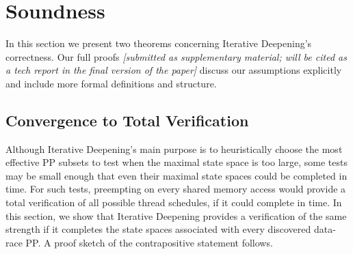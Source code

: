 \section{Soundness}
\label{sec:soundness}

In this section we present two theorems concerning Iterative Deepening's correctness.
Our full proofs
{\em [submitted as supplementary material; will be cited as a tech report in the final version of the paper]}
discuss our assumptions explicitly and include more formal definitions and structure.


\renewcommand\proofname{Proof Sketch}


\subsection{Convergence to Total Verification}
\label{sec:totalverif}

Although Iterative Deepening's main purpose is to heuristically choose the most effective PP subsets to test
when the maximal state space is too large,
some tests may be small enough that even their maximal state spaces could be completed in time.
For such tests, preempting on every shared memory access \cite{spin,inspect} would provide a total verification of all possible thread schedules, if it could complete in time.
In this section, we show that Iterative Deepening provides a verification of the same strength if it completes the state spaces associated with every discovered data-race PP.
A proof sketch of the contrapositive statement follows.

